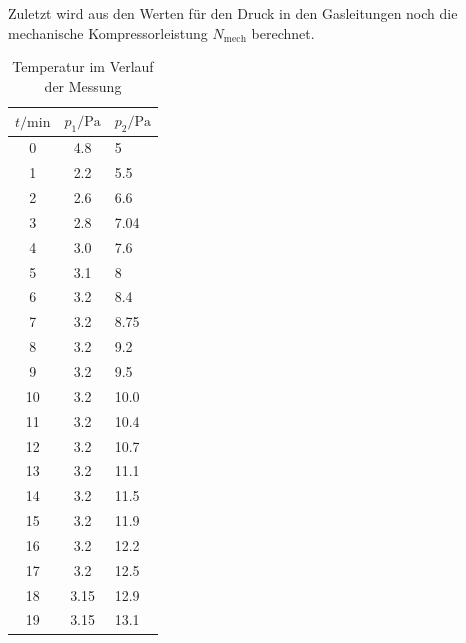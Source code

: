 Zuletzt wird aus den Werten für den Druck in den Gasleitungen noch die mechanische Kompressorleistung $N_{\text{mech}}$ berechnet.

\begin{table}
\centering
\caption{Temperatur im Verlauf der Messung}
\label{tab:Dicke}
  \begin{tabular}{ S[table-format=1,0] S[table-format=3,1] }
    \toprule
    $ t/\mathrm{min}$ & $p_1/\si{\pascal}$& $p_2/\si{\pascal}$\\
       & 4.8  & 5   \\
    1   & 2.2  & 5.5 \\
    2   & 2.6  & 6.6 \\
    3   & 2.8  & 7.04\\
    4   & 3.0  & 7.6 \\
    5   & 3.1  & 8   \\
    6   & 3.2  & 8.4 \\
    7   & 3.2  & 8.75\\
    8   & 3.2  & 9.2 \\
    9   & 3.2  & 9.5 \\
    10  & 3.2  & 10.0\\
    11  & 3.2  & 10.4\\
    12  & 3.2  & 10.7\\
    13  & 3.2  & 11.1\\
    14  & 3.2  & 11.5\\
    15  & 3.2  & 11.9\\
    16  & 3.2  & 12.2\\
    17  & 3.2  & 12.5\\
    18  & 3.15 & 12.9\\
    19  & 3.15 & 13.1\\
    \bottomrule
  \end{tabular}
\end{table}







